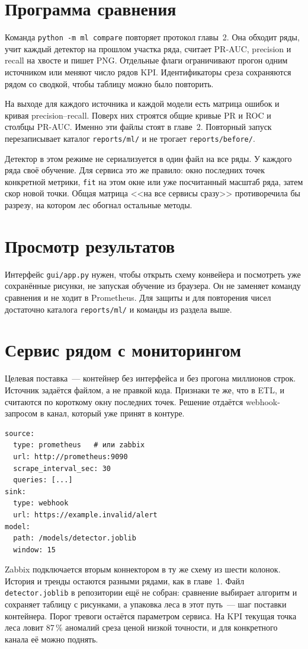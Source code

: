 \section{Программа сравнения}

Команда \texttt{python -m ml compare} повторяет протокол главы~2.
Она обходит ряды, учит каждый детектор на прошлом участка ряда, считает PR-AUC, precision и recall на хвосте и пишет PNG.
Отдельные флаги ограничивают прогон одним источником или меняют число рядов KPI.
Идентификаторы среза сохраняются рядом со сводкой, чтобы таблицу можно было повторить.

На выходе для каждого источника и каждой модели есть матрица ошибок и кривая precision--recall.
Поверх них строятся общие кривые PR и ROC и столбцы PR-AUC.
Именно эти файлы стоят в главе~2.
Повторный запуск перезаписывает каталог \texttt{reports/ml/} и не трогает \texttt{reports/before/}.

Детектор в этом режиме не сериализуется в один файл на все ряды.
У каждого ряда своё обучение.
Для сервиса это же правило: окно последних точек конкретной метрики, \texttt{fit} на этом окне или уже посчитанный масштаб ряда, затем скор новой точки.
Общая матрица <<на все сервисы сразу>> противоречила бы разрезу, на котором лес обогнал остальные методы.

\section{Просмотр результатов}

Интерфейс \texttt{gui/app.py} нужен, чтобы открыть схему конвейера и посмотреть уже сохранённые рисунки, не запуская обучение из браузера.
Он не заменяет команду сравнения и не ходит в Prometheus.
Для защиты и для повторения чисел достаточно каталога \texttt{reports/ml/} и команды из раздела выше.

\section{Сервис рядом с мониторингом}

Целевая поставка~--- контейнер без интерфейса и без прогона миллионов строк.
Источник задаётся файлом, а не правкой кода.
Признаки те же, что в ETL, и считаются по короткому окну последних точек.
Решение отдаётся webhook-запросом в канал, который уже принят в контуре.

\begin{verbatim}
source:
  type: prometheus   # или zabbix
  url: http://prometheus:9090
  scrape_interval_sec: 30
  queries: [...]
sink:
  type: webhook
  url: https://example.invalid/alert
model:
  path: /models/detector.joblib
  window: 15
\end{verbatim}

Zabbix подключается вторым коннектором в ту же схему из шести колонок.
История и тренды остаются разными рядами, как в главе~1.
Файл \texttt{detector.joblib} в репозитории ещё не собран: сравнение выбирает алгоритм и сохраняет таблицу с рисунками, а упаковка леса в этот путь~--- шаг поставки контейнера.
Порог тревоги остаётся параметром сервиса.
На KPI текущая точка леса ловит \(87\,\%\) аномалий среза ценой низкой точности, и для конкретного канала её можно поднять.
